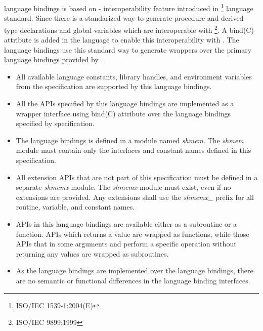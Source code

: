 \openshmem \Fortran[bind(C)] language bindings is based on \Fortran-\Cstd
interoperability feature introduced in
\Fortran[2003]\footnote{ISO/IEC 1539-1:2004(E)} language standard. Since
\Fortran[2003] there is a standarized way to generate procedure and derived-type
declarations and global variables which are interoperable with
\Cstd\footnote{ISO/IEC 9899:1999}. A bind(C) attribute is added in the \Fortran
language to enable this interoperability with \Cstd. The \openshmem
\Fortran[bind(C)] language bindings use this standard way to generate \Fortran
wrappers over the primary \Cstd language bindings provided by \openshmem.

\begin{itemize}
    \item All available language constants, library handles, and environment
    variables from the \openshmem specification are supported by this language
    bindings.
    \item All the \openshmem APIs specified by this language bindings are
    implemented as a wrapper interface using \Fortran bind(C) attribute over the
    \Cstd language bindings specified by \openshmem specification.
    \item The \Fortran[bind(C)] language bindings is defined in a module named
    \textit{shmem}. The \textit{shmem} module must contain only the interfaces
    and constant names defined in this specification.
    \item All \openshmem extension APIs that are not part of this specification
    must be defined in a separate \textit{shmemx} module. The \textit{shmemx}
    module must exist, even if no extensions are provided. Any extensions shall
    use the \textit{shmemx\_} prefix for all routine, variable, and constant
    names.
    \item \openshmem APIs in this language bindings are available either as a
    subroutine or a function. \openshmem \Cstd APIs which returns a value are
    wrapped as functions, while those APIs that in some arguments and perform a
    specific operation without returning any values are wrapped as subroutines.
    \item As the \Fortran[bind(C)] language bindings are implemented over the
    \openshmem \Cstd language bindings, there are no semantic or functional
    differences in the \Fortran[bind(C)] language binding interfaces.
\end{itemize}
